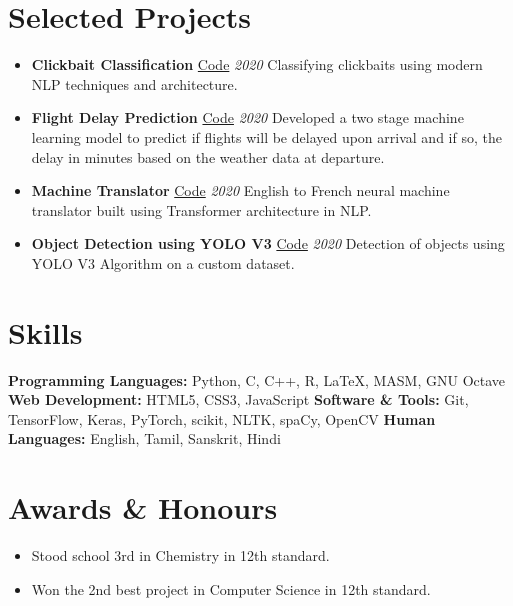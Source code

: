 \documentclass[letterpaper,10pt]{article}
\newenvironment{cvitemize}{
    \begin{itemize}[leftmargin=10pt,label={},afterlabel={},after=\vspace{-12pt}]
}{
    \end{itemize}
}
\newcommand{\point}{\raisebox{0.1\height}{$\rightarrow$}\hspace{4pt}}
\begin{document}
\section*{Selected Projects}
\begin{cvitemize}
    \item{
        \textbf{Clickbait Classification} \hfill \faGithub \enspace \href{https://github.com/MBadriNarayanan/ClickbaitClassification}{Code} \enspace \textit{2020} \newline
        Classifying clickbaits using modern NLP techniques and architecture.
    }
    \item{
        \textbf{Flight Delay Prediction} \hfill \faGithub \enspace \href{https://github.com/MBadriNarayanan/FlightDelayPrediction}{Code} \enspace \textit{2020} \newline
        Developed a two stage machine learning model to predict if flights will be delayed upon arrival and if so, the delay in minutes based on the weather data at departure.
    }
    \item{
        \textbf{Machine Translator} \hfill \faGithub \enspace \href{https://github.com/MBadriNarayanan/MachineTranslation}{Code} \enspace \textit{2020} \newline
        English to French neural machine translator built using Transformer architecture in NLP.
    }
    \item{
        \textbf{Object Detection using YOLO V3} \hfill \faGithub \enspace \href{https://github.com/MBadriNarayanan/ObjectDetectionUsingYOLOv3}{Code} \enspace \textit{2020} \newline
        Detection of objects using YOLO V3 Algorithm on a custom dataset.
    }
\end{cvitemize}

\section*{Skills}
\textbf{Programming Languages:} Python, C, C++, R, \LaTeX, MASM, GNU Octave\newline
\textbf{Web Development:} HTML5, CSS3, JavaScript \newline
\textbf{Software \& Tools:} Git, TensorFlow, Keras, PyTorch, scikit, NLTK, spaCy, OpenCV \newline
\textbf{Human Languages:} English, Tamil, Sanskrit, Hindi

\newpage
\section*{Awards \& Honours}
\begin{cvitemize}
    \item \point Stood school 3rd in Chemistry in 12th standard.
    \item \point Won the 2nd best project in Computer Science in 12th standard.
\end{cvitemize}
\end{document}
